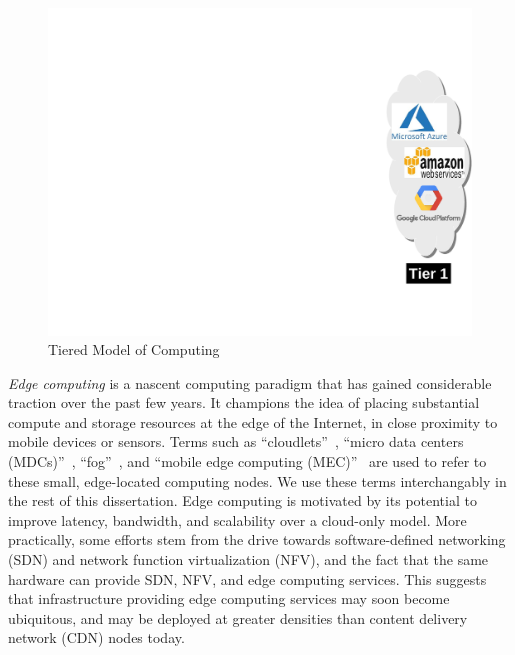 \begin{figure}[t]
\begin{minipage}[c]{2.7in}
\end{minipage}
\begin{minipage}[c]{1in}
\includegraphics[scale=0.45]{FIGS/fig-3tier-C.pdf}
\end{minipage}
\centering
{}
\caption{\small Tiered Model of Computing}
\label{fig:3tier}
\end{figure}

{\em Edge computing} is a nascent computing paradigm that has gained
considerable traction over the past few years. It champions the idea of placing
substantial compute and storage resources at the edge of the Internet, in close
proximity to mobile devices or sensors.  Terms such as
``cloudlets''~\cite{Satya2009}, ``micro data centers (MDCs)''~\cite{Greene2012},
``fog''~\cite{Bonomi2012}, and ``mobile edge computing (MEC)''~\cite{Brown2013}
are used to refer to these small, edge-located computing nodes.  We use these
terms interchangably in the rest of this dissertation. Edge computing is motivated by
its potential to improve latency, bandwidth, and scalability over a cloud-only
model.  More practically, some efforts stem from the drive towards
software-defined networking (SDN) and network function virtualization (NFV), and
the fact that the same hardware can provide SDN, NFV, and edge computing
services. This suggests that infrastructure providing edge computing services
may soon become ubiquitous, and may be deployed at greater densities than
content delivery network (CDN) nodes today. 

